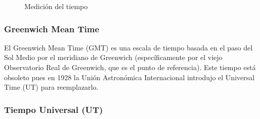\documentclass[a4paper,12pt,twoside]{article}
\begin{document}
\begin{figure}[!h]

  \caption{Medici\'on del tiempo}
\end{figure}

\subsubsection{ Greenwich Mean Time}
\label{sec:greenwich.mean.time}

El  Greenwich Mean Time (GMT)  es una escala de tiempo basada en el paso
del Sol Medio por el meridiano de Greenwich (espec\'ificamente por el viejo
Observatorio Real de Greenwich, que es el punto de referencia).
Este tiempo est\'a  obsoleto pues en 1928 la Uni\'on Astron\'omica 
 Internacional introdujo el  Universal Time (UT) para reemplazarlo.

\subsubsection{Tiempo Universal (UT)}
\label{sec:tiempo.universal}
\end{document}
